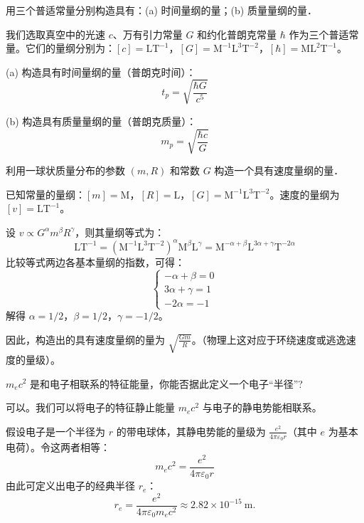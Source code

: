\begin{exercise}\label{ex:1.7}
用三个普适常量分别构造具有：(a) 时间量纲的量；(b) 质量量纲的量．
\end{exercise}
\begin{solution}
我们选取真空中的光速 $c$、万有引力常量 $G$ 和约化普朗克常量 $\hbar$ 作为三个普适常量。它们的量纲分别为：$[c] = \text{L}\text{T}^{-1}$，$[G] = \text{M}^{-1}\text{L}^3\text{T}^{-2}$，$[\hbar] = \text{M}\text{L}^2\text{T}^{-1}$。

(a) 构造具有时间量纲的量（普朗克时间）：
$$ t_p = \sqrt{\frac{\hbar G}{c^5}} $$

(b) 构造具有质量量纲的量（普朗克质量）：
$$ m_p = \sqrt{\frac{\hbar c}{G}} $$
\end{solution}

\begin{exercise}\label{ex:1.8}
利用一球状质量分布的参数 $(m, R)$ 和常数 $G$ 构造一个具有速度量纲的量．
\end{exercise}
\begin{solution}
已知常量的量纲：$[m] = \text{M}$，$[R] = \text{L}$，$[G] = \text{M}^{-1}\text{L}^3\text{T}^{-2}$。速度的量纲为 $[v] = \text{L}\text{T}^{-1}$。

设 $v \propto G^\alpha m^\beta R^\gamma$，则其量纲等式为：
$$ \text{L}\text{T}^{-1} = (\text{M}^{-1}\text{L}^3\text{T}^{-2})^\alpha \text{M}^\beta \text{L}^\gamma = \text{M}^{-\alpha+\beta}\text{L}^{3\alpha+\gamma}\text{T}^{-2\alpha} $$
比较等式两边各基本量纲的指数，可得：
$$ \begin{cases} -\alpha + \beta = 0 \\ 3\alpha + \gamma = 1 \\ -2\alpha = -1 \end{cases} $$
解得 $\alpha = 1/2$，$\beta = 1/2$，$\gamma = -1/2$。

因此，构造出的具有速度量纲的量为 $\sqrt{\frac{Gm}{R}}$。（物理上这对应于环绕速度或逃逸速度的量级）。
\end{solution}

\begin{exercise}\label{ex:1.9}
$m_e c^2$ 是和电子相联系的特征能量，你能否据此定义一个电子“半径”?
\end{exercise}
\begin{solution}
可以。我们可以将电子的特征静止能量 $m_e c^2$ 与电子的静电势能相联系。

假设电子是一个半径为 $r$ 的带电球体，其静电势能的量级为 $\frac{e^2}{4\pi\varepsilon_0 r}$（其中 $e$ 为基本电荷）。令这两者相等：
$$ m_e c^2 = \frac{e^2}{4\pi\varepsilon_0 r} $$
由此可定义出电子的经典半径 $r_e$：
$$ r_e = \frac{e^2}{4\pi\varepsilon_0 m_e c^2}
\approx 2.82 \times 10^{-15}\ \mathrm{m}. $$
\end{solution}

